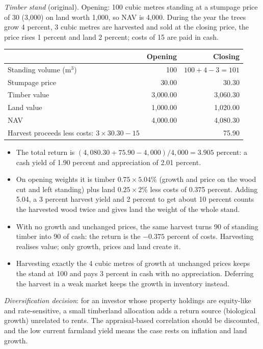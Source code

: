 \begin{qfmethod}
\emph{Timber stand} (original). Opening: 100 cubic metres standing at a stumpage price of 30 (3,000) on land worth 1,000, so NAV is 4,000. During the year the trees grow 4 percent, 3 cubic metres are harvested and sold at the closing price, the price rises 1 percent and land 2 percent; costs of 15 are paid in cash.
\begin{center}\small
\begin{tabular}{@{}lrr@{}}
\toprule
 & Opening & Closing \\
\midrule
Standing volume (m$^3$) & 100 & $100+4-3=101$ \\
Stumpage price & 30.00 & 30.30 \\
Timber value & 3{,}000.00 & 3{,}060.30 \\
Land value & 1{,}000.00 & 1{,}020.00 \\
NAV & 4{,}000.00 & 4{,}080.30 \\
\midrule
Harvest proceeds less costs: $3\times30.30-15$ & & 75.90 \\
\bottomrule
\end{tabular}
\end{center}
\begin{itemize}
\item The total return is $(4{,}080.30+75.90-4{,}000)/4{,}000=3.905$ percent: a cash yield of 1.90 percent and appreciation of 2.01 percent.
\item On opening weights it is timber $0.75\times5.04\%$ (growth and price on the wood cut and left standing) plus land $0.25\times2\%$ less costs of 0.375 percent. Adding 5.04, a 3 percent harvest yield and 2 percent to get about 10 percent counts the harvested wood twice and gives land the weight of the whole stand.
\item With no growth and unchanged prices, the same harvest turns 90 of standing timber into 90 of cash: the return is the $-0.375$ percent of costs. Harvesting realises value; only growth, prices and land create it.
\item Harvesting exactly the 4 cubic metres of growth at unchanged prices keeps the stand at 100 and pays 3 percent in cash with no appreciation. Deferring the harvest in a weak market keeps the growth in inventory instead.
\end{itemize}

\emph{Diversification decision}: for an investor whose property holdings are equity-like and rate-sensitive, a small timberland allocation adds a return source (biological growth) unrelated to rents. The appraisal-based correlation should be discounted, and the low current farmland yield means the case rests on inflation and land growth.


\end{qfmethod}
